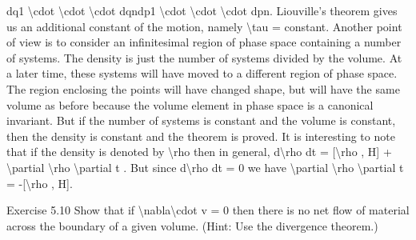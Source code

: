 \begin{exercise}
dq1 \textbackslash{}cdot  \textbackslash{}cdot  \textbackslash{}cdot  dqndp1 \textbackslash{}cdot  \textbackslash{}cdot  \textbackslash{}cdot  dpn.
Liouville's theorem gives us an additional constant of the motion, namely
\textbackslash{}tau  = constant.
Another point of view is to consider an infinitesimal region of phase space
containing a number of systems. The density is just the number of systems
divided by the volume. At a later time, these systems will have moved to a different region of phase space. The region enclosing the points will have changed
shape, but will have the same volume as before because the volume element
in phase space is a canonical invariant. But if the number of systems is constant and the volume is constant, then the density is constant and the theorem
is proved.
It is interesting to note that if the density is denoted by \textbackslash{}rho  then in general,
d\textbackslash{}rho
dt = [\textbackslash{}rho , H] + \textbackslash{}partial \textbackslash{}rho
\textbackslash{}partial t .
But since d\textbackslash{}rho
dt = 0 we have
\textbackslash{}partial \textbackslash{}rho
\textbackslash{}partial t = -[\textbackslash{}rho , H].
\end{exercise}

\begin{exercise}
Exercise 5.10 Show that if \textbackslash{}nabla\textbackslash{}cdot  v = 0 then there is no net flow of material across the boundary of a given volume. (Hint: Use the divergence
theorem.)
\end{exercise}

